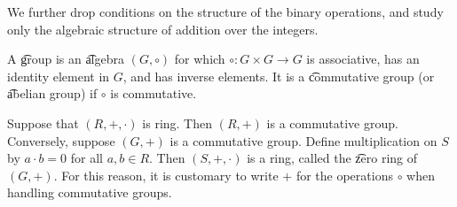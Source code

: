 

We further drop conditions on the structure of the binary operations, and study only the algebraic structure of addition over the integers.


A \t{group} is an \t{algebra} $(G, \circ)$ for which $\circ: G \times G \to G$ is associative, has an identity element in $G$, and has inverse elements.
It is a \t{commutative group} (or \t{abelian group}) if $\circ$ is commutative.

Suppose that $(R, +, \cdot )$ is ring.
Then $(R, +)$ is a commutative group.
Conversely, suppose $(G, +)$ is a commutative group.
Define multiplication on $S$ by $a\cdot b = 0$ for all $a, b \in R$.
Then $(S, +, \cdot )$ is a ring, called the \t{zero ring} of $(G, +)$.
For this reason, it is customary to write $+$ for the operations $\circ$ when handling commutative groups.

\blankpage
